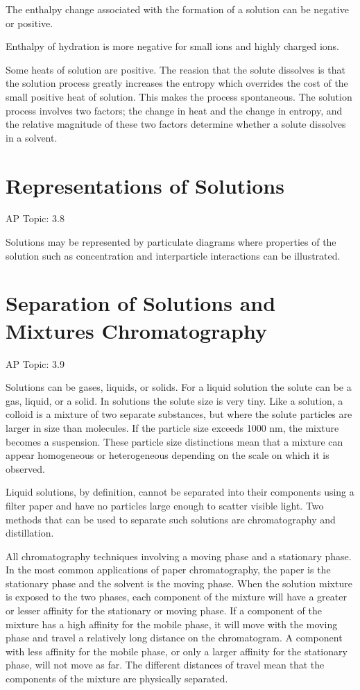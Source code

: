 \documentclass[../chem.tex]{subfiles}
\begin{document}
The enthalpy change associated with the formation of a solution can be negative or positive.

Enthalpy of hydration is more negative for small ions and highly charged ions.

Some heats of solution are positive. The reasion that the solute dissolves is that the solution process greatly increases the entropy which 
overrides the cost of the small positive heat of solution. This makes the process spontaneous. The solution process involves two factors; the change in heat and the 
change in entropy, and the relative magnitude of these two factors determine whether a solute dissolves in a solvent.
\section{Representations of Solutions}
AP Topic: 3.8

Solutions may be represented by particulate diagrams where properties of the solution such as concentration and interparticle interactions 
can be illustrated.
\section{Separation of Solutions and Mixtures Chromatography}
AP Topic: 3.9

Solutions can be gases, liquids, or solids. For a liquid solution the solute can be a gas, liquid, or a solid. In solutions the solute size 
is very tiny. Like a solution, a colloid is a mixture of two separate substances, but where the solute particles are larger in size than molecules.
If the particle size exceeds 1000 nm, the mixture becomes a suspension. These particle size distinctions mean that a mixture can appear homogeneous 
or heterogeneous depending on the scale on which it is observed.

Liquid solutions, by definition, cannot be separated into their components using a filter paper and have no particles large enough to scatter
visible light. Two methods that can be used to separate such solutions are chromatography and distillation.

All chromatography techniques involving a moving phase and a stationary phase. In the most common applications of paper chromatography, 
the paper is the stationary phase and the solvent is the moving phase. When the solution mixture is exposed to the two phases, each component
of the mixture will have a greater or lesser affinity for the stationary or moving phase. If a component of the mixture has a high 
affinity for the mobile phase, it will move with the moving phase and travel a relatively long distance on the chromatogram. A component with 
less affinity for the mobile phase, or only a larger affinity for the stationary phase, will not move as far. The different distances of travel mean 
that the components of the mixture are physically separated.
\end{document}
